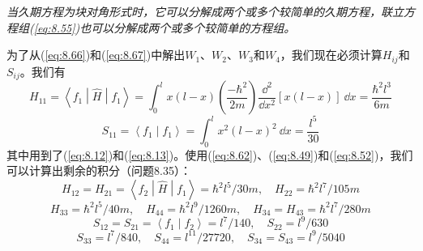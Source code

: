 \begin{examplebox}
        \textit{当久期方程为块对角形式时，它可以分解成两个或多个较简单的久期方程，联立方程组(\ref{eq:8.55})也可以分解成两个或多个较简单的方程组。}

        为了从(\ref{eq:8.66})和(\ref{eq:8.67})中解出$W_1$、$W_2$、$W_3$和$W_4$，我们现在必须计算$H_{ij}$和$S_{ij}$。我们有
        \begin{equation*}
            H_{11} = \left\langle f_1 \middle| \hat{H} \middle| f_1 \right\rangle = \int_0^l x(l-x)\left(\frac{-\hbar^2}{2m}\right)\frac{\dd ^2}{\dd x^2}\left[x(l-x)\right]\:\dd x = \frac{\hbar^2 l^3}{6m}
        \end{equation*}
        \begin{equation*}
            S_{11} = \left\langle f_1 \middle| f_1 \right\rangle = \int_0^l x^2(l-x)^2\:\dd x = \frac{l^5}{30}
        \end{equation*}
        其中用到了(\ref{eq:8.12})和(\ref{eq:8.13})。使用(\ref{eq:8.62})、(\ref{eq:8.49})和(\ref{eq:8.52})，我们可以计算出剩余的积分（问题8.35）：
        \begin{equation*}
            H_{12} = H_{21} = \left\langle f_2 \middle| \hat{H} \middle| f_1 \right\rangle = \hbar^2 l^5/30m, \quad H_{22} = \hbar^2 l^7/105m
        \end{equation*}
        \begin{equation*}
            H_{33} = \hbar^2 l^5/40m, \quad H_{44} = \hbar^2 l^9/1260m, \quad H_{34} = H_{43} = \hbar^2 l^7/280m
        \end{equation*}
        \begin{equation*}
            S_{12} = S_{21} = \left\langle f_1 \middle| f_2 \right\rangle = l^7/140, \quad S_{22} = l^9/630
        \end{equation*}
        \begin{equation*}
            S_{33} = l^7/840, \quad S_{44} = l^{11}/27720, \quad S_{34} = S_{43} = l^9/5040
        \end{equation*}


\end{examplebox}
